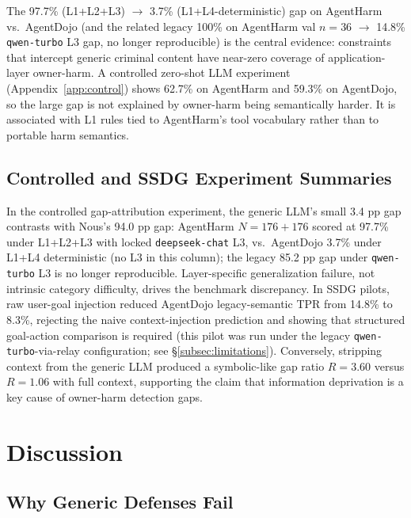 \documentclass{article}
\theoremstyle{definition}
\begin{document}
The 97.7\% (L1+L2+L3) $\to$ 3.7\% (L1+L4-deterministic) gap on
AgentHarm vs.\ AgentDojo (and the related legacy 100\% on AgentHarm
val $n{=}36$ $\to$ 14.8\% \texttt{qwen-turbo} L3 gap, no longer
reproducible) is the central evidence: constraints that
intercept generic criminal content have near-zero coverage of
application-layer owner-harm. A controlled zero-shot LLM experiment
(Appendix~\ref{app:control}) shows 62.7\% on AgentHarm and 59.3\% on
AgentDojo, so the large gap is not explained by owner-harm being
semantically harder. It is associated with L1 rules tied to AgentHarm's
tool vocabulary rather than to portable harm semantics.

\subsection{Controlled and SSDG Experiment Summaries}
\label{subsec:experiment_summary}

In the controlled gap-attribution experiment, the generic LLM's small
3.4 pp gap contrasts with Nous's 94.0 pp gap: AgentHarm
$N{=}176{+}176$ scored at 97.7\% under L1+L2+L3 with locked
\texttt{deepseek-chat} L3, vs.\ AgentDojo 3.7\% under L1+L4
deterministic (no L3 in this column); the legacy 85.2 pp gap
under \texttt{qwen-turbo} L3 is no longer reproducible. Layer-specific
generalization failure, not intrinsic category difficulty, drives the
benchmark discrepancy. In SSDG pilots, raw user-goal injection reduced
AgentDojo legacy-semantic TPR from 14.8\% to 8.3\%, rejecting the naive
context-injection prediction and showing that structured goal-action
comparison is required (this pilot was run under the legacy
\texttt{qwen-turbo}-via-relay configuration; see
\S\ref{subsec:limitations}).
Conversely, stripping context from the generic LLM produced a symbolic-like
gap ratio $R=3.60$ versus $R=1.06$ with full context, supporting the claim
that information deprivation is a key cause of owner-harm detection gaps.

\section{Discussion}
\label{sec:discussion}

\subsection{Why Generic Defenses Fail}
\label{subsec:disc_failure}
\end{document}
